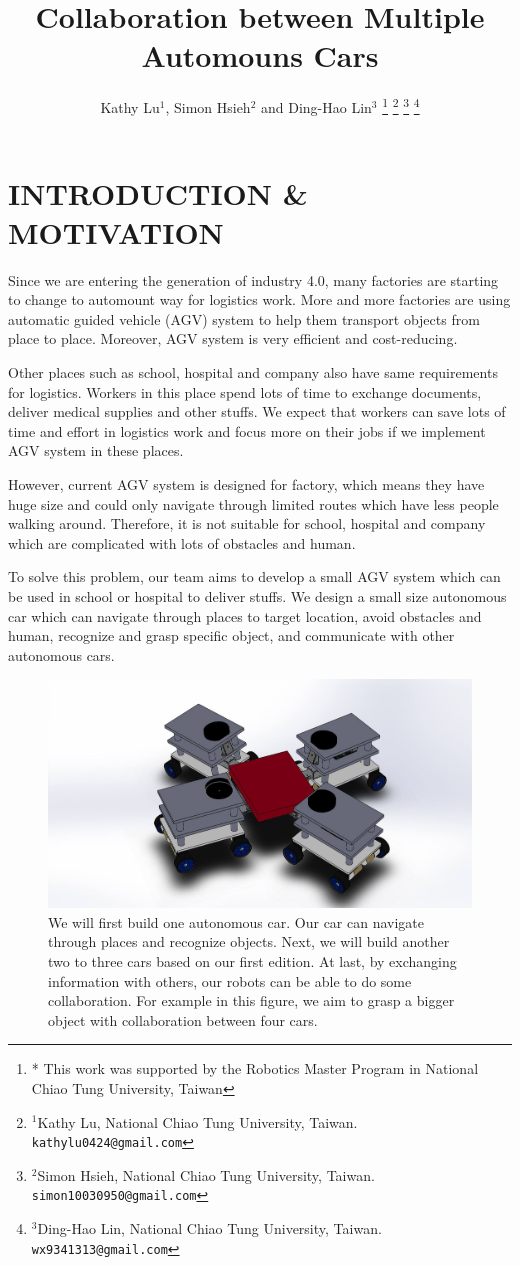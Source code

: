 \documentclass[a4paper, 10pt, conference]{ieeeconf}      %
\title{\LARGE \bf
Collaboration between Multiple Automouns Cars
}
\author{Kathy Lu$^{1}$, Simon Hsieh$^{2}$ and Ding-Hao Lin$^{3}$%
\thanks{* This work was supported by the Robotics Master Program in National Chiao Tung University, Taiwan}%
\thanks{$^{1}$Kathy Lu, National Chiao Tung University, Taiwan.
        {\tt\small kathylu0424@gmail.com}}%
\thanks{$^{2}$Simon Hsieh, National Chiao Tung University, Taiwan.
        {\tt\small simon10030950@gmail.com}}%
\thanks{$^{3}$Ding-Hao Lin, National Chiao Tung University, Taiwan.
        {\tt\small wx9341313@gmail.com}}%
}
\begin{document}
\maketitle
\thispagestyle{empty}
\pagestyle{empty}

\section{INTRODUCTION \& MOTIVATION}

Since we are entering the generation of industry 4.0, many factories are starting to change to automount way for logistics work. More and more factories are using automatic guided vehicle (AGV) system to help them transport objects from place to place. Moreover, AGV system is very efficient and cost-reducing.

Other places such as school, hospital and company also have same requirements for logistics. Workers in this place spend lots of time to exchange documents, deliver medical supplies and other stuffs. We expect that workers can save lots of time and effort in logistics work and focus more on their jobs if we implement AGV system in these places. 

However, current AGV system is designed for factory, which means they have huge size and could only navigate through limited routes which have less people walking around. Therefore, it is not suitable for school, hospital and company which are complicated with lots of obstacles and human. 

To solve this problem, our team aims to develop a small AGV system which can be used in school or hospital to deliver stuffs. We design a small size autonomous car which can navigate through places to target location, avoid obstacles and human, recognize and grasp specific object, and communicate with other autonomous cars.

\begin{figure}[t]
\includegraphics[width=0.95\columnwidth]{Teaser}
\centering
\caption{We will first build one autonomous car. Our car can navigate through places and recognize objects. Next, we will build another two to three cars based on our first edition. At last, by exchanging information with others, our robots can be able to do some collaboration. For example in this figure, we aim to grasp a bigger object with collaboration between four cars.}
\end{figure}
\end{document}
